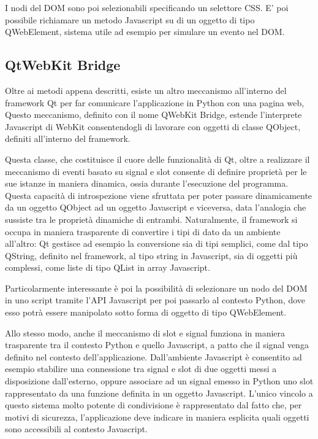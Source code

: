 \documentclass[12pt]{toptesi}
\begin{document}
I nodi del DOM sono poi selezionabili specificando un selettore CSS. E' poi possibile richiamare un metodo Javascript su di un oggetto di tipo QWebElement, sistema utile ad esempio per simulare un evento nel DOM.

\subsection{QtWebKit Bridge}

Oltre ai metodi appena descritti, esiste un altro meccanismo all'interno del framework Qt per far comunicare l'applicazione in Python con una pagina web, Questo meccanismo, definito con il nome QWebKit  Bridge, estende l'interprete Javascript di WebKit consentendogli di lavorare con oggetti di classe QObject, definiti all'interno del framework. 

Questa classe, che costituisce il cuore delle funzionalità di Qt, oltre a realizzare il meccanismo di eventi basato su signal e slot consente di definire proprietà per le sue istanze in maniera dinamica, ossia durante l'esecuzione del programma. Questa capacità di introspezione viene sfruttata per poter passare dinamicamente da un oggetto QObject ad un oggetto Javascript e viceversa, data l'analogia che sussiste tra le proprietà dinamiche di entrambi. Naturalmente, il framework si occupa in maniera trasparente di convertire i tipi di dato da un ambiente all'altro: Qt gestisce ad esempio la conversione sia di tipi semplici, come dal tipo QString, definito nel framework, al tipo string in Javascript, sia di oggetti più complessi, come liste di tipo QList in array Javascript.

Particolarmente interessante è poi la possibilità di selezionare un nodo del DOM in uno script tramite l'API Javascript per poi passarlo al contesto Python, dove esso potrà essere manipolato sotto forma di oggetto di tipo QWebElement. 

Allo stesso modo, anche il meccanismo di slot e signal funziona in maniera trasparente tra il contesto Python e quello Javascript, a patto che il signal venga definito nel contesto dell'applicazione. Dall'ambiente Javascript è consentito ad esempio stabilire una connessione tra signal e slot di due oggetti messi a disposizione dall'esterno, oppure associare ad un signal emesso in Python uno slot rappresentato da una funzione definita in un oggetto Javascript. L'unico vincolo a questo sistema molto potente di condivisione è rappresentato dal fatto che, per motivi di sicurezza, l'applicazione deve indicare in maniera esplicita quali oggetti sono accessibili al contesto Javascript.
\end{document}
